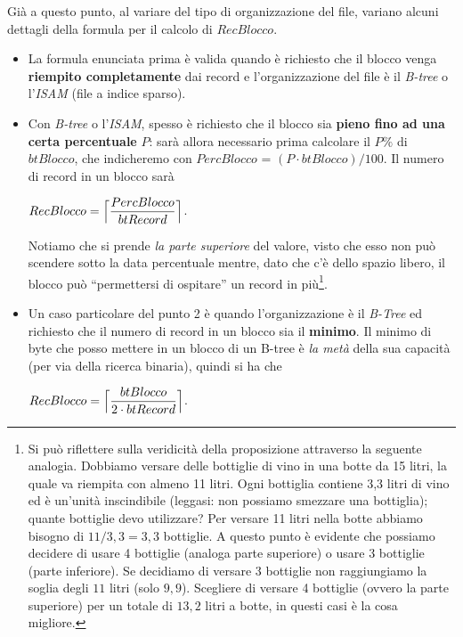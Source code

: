  Già a questo punto, al variare del tipo di organizzazione del file, variano alcuni dettagli della formula per il calcolo di
 $RecBlocco$.
 \begin{itemize}
  \item La formula enunciata prima è valida quando è richiesto che il blocco venga \textbf{riempito completamente} dai record e 
 l'organizzazione del file è il \emph{B-tree} o l'\emph{ISAM} (file a indice sparso).
  \item Con \emph{B-tree} o l'\emph{ISAM}, spesso è richiesto che il blocco sia \textbf{pieno fino ad una certa percentuale} $P$:
  sarà allora necessario prima calcolare il $P\%$ di $btBlocco$, che indicheremo con $PercBlocco$ = $(P \cdot btBlocco)/100$. Il numero
  di record in un blocco sarà
  \begin{center}
  $RecBlocco = \Bigl\lceil \dfrac{PercBlocco}{btRecord} \Bigr\rceil$.
  \end{center}
  Notiamo che si prende \emph{la parte superiore} del valore, visto che esso non può scendere sotto la data percentuale mentre, 
   dato che c'è dello spazio libero, il blocco può ``permettersi di ospitare'' un record in più\footnote{Si può riflettere sulla
  veridicità della proposizione attraverso la seguente analogia.
  Dobbiamo versare delle bottiglie di vino in una botte da 15 litri, la quale va riempita con almeno 11 litri. 
  Ogni bottiglia contiene 3,3 litri di vino ed è un'unità inscindibile (leggasi: non possiamo smezzare una bottiglia); quante bottiglie
  devo utilizzare? Per versare 11 litri nella botte abbiamo bisogno di $11/3,3=3,3$ bottiglie. A questo punto è evidente che 
  possiamo decidere di usare 4 bottiglie (analoga parte superiore) o usare 3 bottiglie (parte inferiore). Se decidiamo di versare 
  3 bottiglie non raggiungiamo la soglia degli $11$ litri (solo $9,9$). Scegliere di versare 4 bottiglie (ovvero 
  la parte superiore) per un totale di $13,2$ litri a botte, in questi casi è la cosa migliore.}.  
  \item Un caso particolare del punto 2 è quando l'organizzazione è il \emph{B-Tree} ed richiesto che il numero di record in un blocco
  sia il \textbf{minimo}. Il minimo di byte che posso mettere in un blocco di un B-tree è \emph{la metà} della sua capacità
  (per via della ricerca binaria), quindi si ha che
   \begin{center}
  $RecBlocco = \Bigl\lceil \dfrac{btBlocco}{2\cdot btRecord} \Bigr\rceil$.\\
  \end{center}
 \end{itemize}
 
